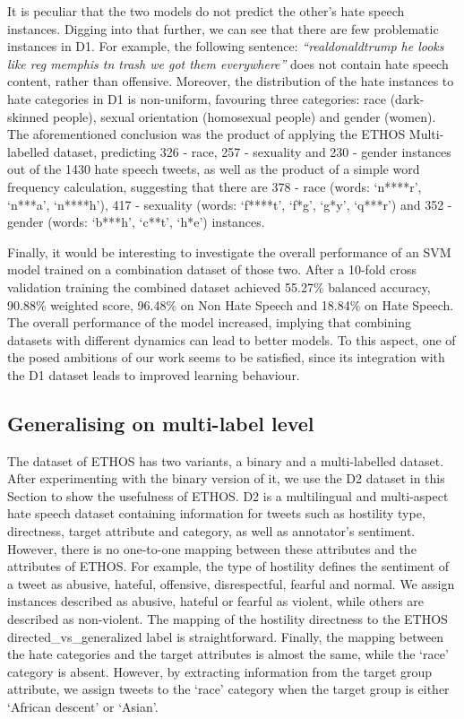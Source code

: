 \documentclass{article}
\begin{document}
It is peculiar that the two models do not predict the other's hate speech instances. Digging into that further, we can see that there are few problematic instances in D1. For example, the following sentence: \textit{``realdonaldtrump he looks like reg memphis tn trash we got them everywhere''} does not contain hate speech content, rather than offensive. Moreover, the distribution of the hate instances to hate categories in D1 is non-uniform, favouring three categories: race (dark-skinned people), sexual orientation (homosexual people) and gender (women). The aforementioned conclusion was the product of applying the ETHOS Multi-labelled dataset, predicting 326 - race, 257 - sexuality and 230 - gender instances out of the 1430 hate speech tweets, as well as the product of a simple word frequency calculation, suggesting that there are 378 - race (words: `n****r', `n***a', `n****h'), 417 - sexuality (words: `f****t', `f*g', `g*y', `q***r') and 352 - gender (words: `b***h', `c**t', `h*e') instances.

Finally, it would be interesting to investigate the overall performance of an SVM model trained on a combination dataset of those two. After a 10-fold cross validation training the combined dataset achieved 55.27\% balanced accuracy, 90.88\%  weighted score, 96.48\%  on Non Hate Speech and 18.84\%  on Hate Speech. The overall performance of the model increased, implying that combining datasets with different dynamics can lead to better models. To this aspect, one of the posed ambitions of our work seems to be satisfied, since its integration with the D1 dataset leads to improved learning behaviour. 

\subsection{Generalising on multi-label level}

The dataset of ETHOS has two variants, a binary and a multi-labelled dataset. After experimenting with the binary version of it, we use the D2 dataset in this Section to show the usefulness of ETHOS. D2 is a multilingual and multi-aspect hate speech dataset containing information for tweets such as hostility type, directness, target attribute and category, as well as annotator's sentiment. However, there is no one-to-one mapping between these attributes and the attributes of ETHOS. For example, the type of hostility defines the sentiment of a tweet as abusive, hateful, offensive, disrespectful, fearful and normal. We assign instances described as abusive, hateful or fearful as violent, while others are described as non-violent. The mapping of the hostility directness to the ETHOS directed\_vs\_generalized label is straightforward. Finally, the mapping between the hate categories and the target attributes is almost the same, while the `race' category is absent. However, by extracting information from the target group attribute, we assign tweets to the `race' category when the target group is either `African descent' or `Asian'.
\end{document}
